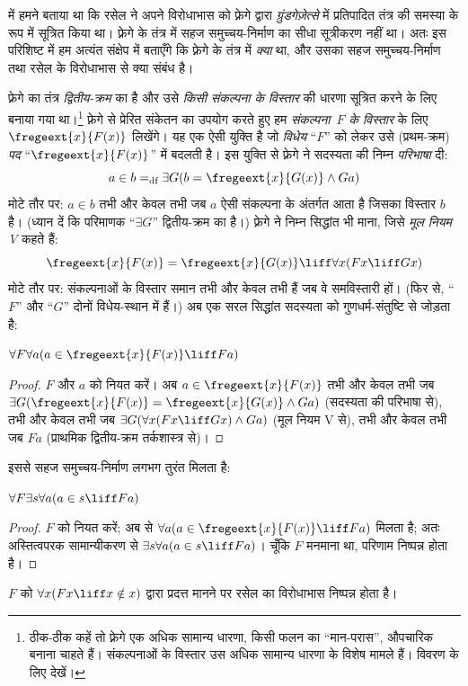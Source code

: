 \documentclass[../../../include/open-logic-section]{subfiles}
\begin{document}


 में हमने बताया था कि रसेल ने अपने विरोधाभास को फ़्रेगे
द्वारा \emph{ग्रुंडगेज़ेत्से} में प्रतिपादित तंत्र की समस्या के रूप में
सूत्रित किया था। फ़्रेगे के तंत्र में सहज समुच्चय-निर्माण का सीधा सूत्रीकरण
नहीं था। अतः इस परिशिष्ट में हम अत्यंत संक्षेप में बताएँगे कि फ़्रेगे के तंत्र
में \emph{क्या} था, और उसका सहज समुच्चय-निर्माण तथा रसेल के विरोधाभास से
क्या संबंध है।

फ़्रेगे का तंत्र \emph{द्वितीय-क्रम} का है और उसे \emph{किसी संकल्पना के
विस्तार} की धारणा सूत्रित करने के लिए बनाया गया था।\footnote{ठीक-ठीक कहें
तो फ़्रेगे एक अधिक सामान्य धारणा, किसी फलन का ``मान-परास'', औपचारिक बनाना
चाहते हैं। संकल्पनाओं के विस्तार उस अधिक सामान्य धारणा के विशेष मामले हैं।
विवरण के लिए \citet[pp.\ 8--9]{Heck2012} देखें।} फ़्रेगे से प्रेरित संकेतन
का उपयोग करते हुए हम \emph{संकल्पना~$F$ के विस्तार} के लिए
$\fregeext{x}{F(x)}$ लिखेंगे। यह एक ऐसी युक्ति है जो \emph{विधेय} ``$F$''
को लेकर उसे (प्रथम-क्रम) \emph{पद} ``$\fregeext{x}{F(x)}$'' में बदलती है।
इस युक्ति से फ़्रेगे ने सदस्यता की निम्न \emph{परिभाषा} दी:
\[
	a \in b =_\text{df} \exists G(b = \fregeext{x}{G(x)} \land Ga)
\]
मोटे तौर पर: $a \in b$ तभी और केवल तभी जब $a$ ऐसी संकल्पना के अंतर्गत आता
है जिसका विस्तार $b$ है। (ध्यान दें कि परिमाणक ``$\exists G$'' द्वितीय-क्रम
का है।) फ़्रेगे ने निम्न सिद्धांत भी माना, जिसे \emph{मूल नियम V} कहते हैं:
$$\fregeext{x}{F(x)} = \fregeext{x}{G(x)} \liff \forall x (Fx \liff Gx)$$
मोटे तौर पर: संकल्पनाओं के विस्तार समान तभी और केवल तभी हैं जब वे
समविस्तारी हों। (फिर से, ``$F$'' और ``$G$'' दोनों विधेय-स्थान में हैं।) अब
एक सरल सिद्धांत सदस्यता को गुणधर्म-संतुष्टि से जोड़ता है:

\begin{lem}[\emph{ग्रुंडगेज़ेत्से} में]
$\forall F \forall a(a \in \fregeext{x}{F(x)} \liff Fa)$
\end{lem}

\begin{proof} 
$F$ और $a$ को नियत करें। अब $a \in \fregeext{x}{F(x)}$ तभी और केवल तभी
जब $\exists G(\fregeext{x}{F(x)} = \fregeext{x}{G(x)} \land Ga)$ (सदस्यता
की परिभाषा से), तभी और केवल तभी जब
$\exists G(\forall x(Fx \liff Gx) \land Ga)$ (मूल नियम V से), तभी और केवल
तभी जब $Fa$ (प्राथमिक द्वितीय-क्रम तर्कशास्त्र से)।
\end{proof}

इससे सहज समुच्चय-निर्माण लगभग तुरंत मिलता है:

\begin{lem}[\emph{ग्रुंडगेज़ेत्से} में]
$\forall F \exists s \forall a (a \in s \liff Fa)$
\end{lem}

\begin{proof}
$F$ को नियत करें; अब  से $\forall a (a \in
\fregeext{x}{F(x)} \liff Fa)$ मिलता है; अतः अस्तित्वपरक सामान्यीकरण से
$\exists s\forall a(a \in s \liff Fa)$। चूँकि $F$ मनमाना था, परिणाम
निष्पन्न होता है।
\end{proof}

$F$ को $\forall x(Fx \liff x \notin x)$ द्वारा प्रदत्त मानने पर रसेल का
विरोधाभास निष्पन्न होता है।
\end{document}
